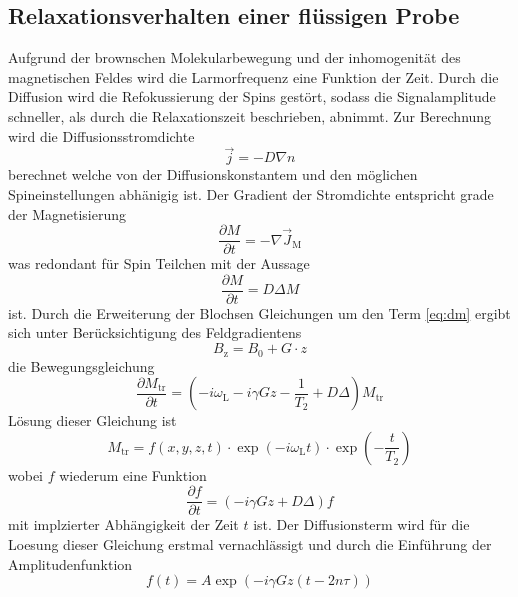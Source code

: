 \subsection{Relaxationsverhalten einer flüssigen Probe}%
\label{sub:relaxationsverhalten_einer_fluessigen_probe}
Aufgrund der brownschen Molekularbewegung und der inhomogenität des
magnetischen Feldes wird die Larmorfrequenz eine Funktion der Zeit. 
Durch die Diffusion wird die Refokussierung der Spins gestört, sodass die
Signalamplitude schneller, als durch die Relaxationszeit beschrieben, abnimmt.
Zur Berechnung wird die Diffusionsstromdichte 
\begin{equation}
		\vec{j} = -D \nabla n	
\end{equation}
berechnet welche von der Diffusionskonstantem und den möglichen
Spineinstellungen abhänigig ist. 
Der Gradient der Stromdichte entspricht grade der Magnetisierung
\begin{equation}
		\frac{\partial M}{\partial t} = - \nabla \vec{J}_\text{M}
\end{equation}
was redondant für Spin  Teilchen mit der Aussage 
\begin{equation}
		\label{eq:dm}
		\frac{\partial M}{\partial t} = D \Delta M
\end{equation}
ist. Durch die Erweiterung der Blochsen Gleichungen um den Term \ref{eq:dm}
ergibt sich unter Berücksichtigung des Feldgradientens
\begin{equation}
		\label{eq:gradB}
		B_\text{z} = B_0 + G \cdot z
\end{equation}
die Bewegungsgleichung
\begin{equation}
		\frac{\partial M_\text{tr}}{\partial t} = \left(- i \omega_\text{L} - i \gamma
Gz - \frac{1}{T_2} + D \Delta \right) M_\text{tr}
\end{equation}
Lösung dieser Gleichung ist 
\begin{equation}
		M_\text{tr} = f(x,y,z,t) \cdot \exp(-i\omega_\text{L}t) \cdot
		\exp\left(-\frac{t}{T_\text{2}}\right)
\end{equation}
wobei $f$ wiederum eine Funktion  
\begin{equation}
		\frac{\partial f}{\partial t} = \left(-i \gamma Gz + D \Delta \right) f
\end{equation}
mit implzierter Abhängigkeit der Zeit $t$ ist.
Der Diffusionsterm wird für die Loesung dieser Gleichung erstmal vernachlässigt 
und durch die Einführung der Amplitudenfunktion 
\begin{equation}
		f(t) = A \exp \left( -i \gamma Gz ( t -2n\tau) \right)
\end{equation}
